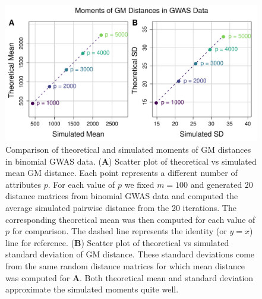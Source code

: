 \documentclass[10pt,letterpaper]{article}\usepackage[]{graphicx}\usepackage[]{color}
\begin{document}
\begin{figure}[H]
	\includegraphics[width=\textwidth]{compared_moments_gwas_gm.pdf}
	\caption{Comparison of theoretical and simulated moments of GM distances in binomial GWAS data. (\textbf{A}) Scatter plot of theoretical vs simulated mean GM distance. Each point represents a different number of attributes $p$. For each value of $p$ we fixed $m=100$ and generated 20 distance matrices from binomial GWAS data and computed the average simulated pairwise distance from the 20 iterations. The corresponding theoretical mean was then computed for each value of $p$ for comparison. The dashed line represents the identity (or $y=x$) line for reference. (\textbf{B}) Scatter plot of theoretical vs simulated standard deviation of GM distance. These standard deviations come from the same random distance matrices for which mean distance was computed for \textbf{A}. Both theoretical mean and standard deviation approximate the simulated moments quite well.}
\end{figure}
\end{document}
